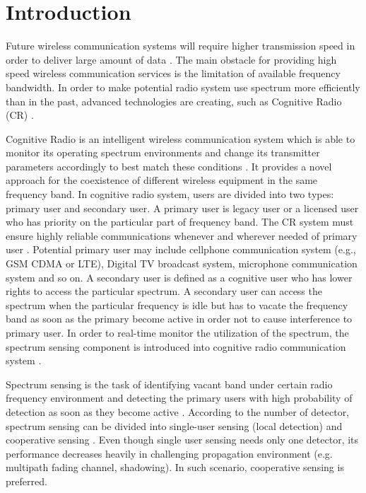 \chapter{Introduction}
Future wireless communication systems will require higher transmission speed in order to deliver large amount of data \cite{pelcat20133gpp}. The main obstacle for providing high speed wireless communication services is the limitation of available frequency bandwidth. In order to make potential radio system use spectrum more efficiently than in the past, advanced technologies are creating, such as Cognitive Radio (CR) \cite{nonotice}. 

Cognitive Radio is an intelligent wireless communication system which is able to monitor its operating spectrum environments and change its transmitter parameters accordingly to best match these conditions \cite{wang2011advances} \cite{a001}. It provides a novel approach for the coexistence of different wireless equipment in the same frequency band. In cognitive radio system, users are divided into two types: primary user and secondary user. A primary user is legacy user or a licensed user who has priority on the particular part of frequency band. The CR system must ensure highly reliable communications whenever and wherever needed of primary user \cite{a001}. Potential primary user may include cellphone communication system (e.g., GSM CDMA or LTE), Digital TV broadcast system, microphone communication system and so on. A secondary user is defined as a cognitive user who has lower rights to access the particular spectrum. A secondary user can access the spectrum when the particular frequency is idle but has to vacate the frequency band as soon as the primary become active in order not to cause interference to primary user. 
In order to real-time monitor the utilization of the spectrum, the spectrum sensing component is introduced into cognitive radio communication system \cite{buddhikot2007understanding} \cite{tandra2009spectrum}.   

Spectrum sensing is the task of identifying vacant band under certain radio frequency environment and detecting the primary users with high probability of detection as soon as they become active \cite{umar2012spectrum}. 
According to the number of detector, spectrum sensing can be divided into single-user sensing (local detection) \cite{axell2010overview} \cite{wang2011advances} and cooperative sensing \cite{akyildiz2011cooperative}. Even though single user sensing needs only one detector, its performance decreases heavily in challenging propagation environment (e.g. multipath fading channel, shadowing). In such scenario, cooperative sensing is preferred.  

